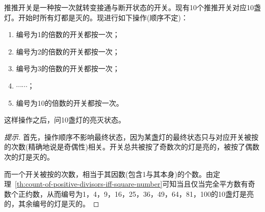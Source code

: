 \begin{example}
  推推开关是一种按一次就转变接通与断开状态的开关。现有10个推推开关对应10盏灯。开始时所有灯都是灭的。现进行如下操作(顺序不定)：
  \begin{enumerate}
  \item 编号为1的倍数的开关都按一次；
  \item 编号为2的倍数的开关都按一次；
  \item 编号为3的倍数的开关都按一次；
  \item $\cdots\cdots$；
  \item 编号为10的倍数的开关都按一次。
  \end{enumerate}
  这样操作之后，问10盏灯的亮灭状态。
\end{example}
\begin{proof}[提示]\let\qed\relax
  首先，操作顺序不影响最终状态，因为某盏灯的最终状态只与对应开关被按的次数(精确地说是奇偶性)相关。开关总共被按了奇数次的灯是亮的，被按了偶数次的灯是灭的。

  而一个开关被按的次数，相当于其因数(包含1与其本身)的个数。由定理~\ref{th:count-of-positive-divisors-iff-square-number}可知当且仅当完全平方数有奇数个正约数，从而编号为1，4，9，16，25，36，49，64，81，100的10盏灯是亮的，其余编号的灯是灭的。

\end{proof}
